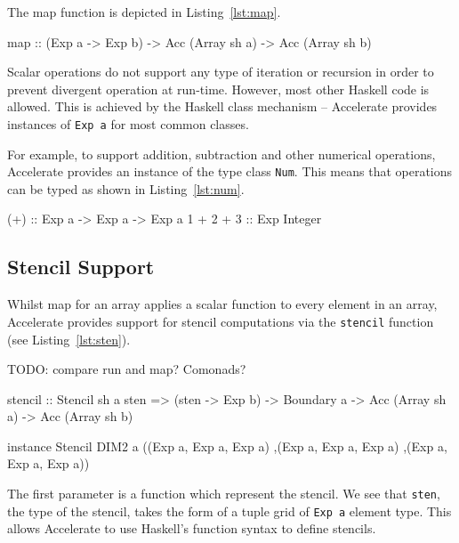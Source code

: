 \documentclass[12pt,a4paper,twoside]{scrbook}
\begin{document}
The map function is depicted in Listing~\ref{lst:map}.

\begin{hflisting}[label={lst:map}, caption=The type of the \texttt{map}
  operation as defined by Accelerate.]
map :: (Exp a -> Exp b) -> Acc (Array sh a)
       -> Acc (Array sh b)
\end{hflisting}

Scalar operations do not support any type of iteration or recursion in order to
prevent divergent operation at run-time. However, most other Haskell code is
allowed. This is achieved by the Haskell class mechanism -- Accelerate provides
instances of \texttt{Exp a} for most common classes.

For example, to support addition, subtraction and other numerical operations,
Accelerate provides an instance of the type class \texttt{Num}. This means that
operations can be typed as shown in Listing~\ref{lst:num}.

\begin{hflisting}[label={lst:num}, caption=The type of addition overloaded by Accelerate.]
(+) :: Exp a -> Exp a -> Exp a
1 + 2 + 3 :: Exp Integer
\end{hflisting}

\subsection{Stencil Support}

Whilst map for an array applies a scalar function to every element in an array,
Accelerate provides support for stencil computations via the \texttt{stencil}
function (see Listing~\ref{lst:sten}).

TODO: compare run and map? Comonads?

\begin{hflisting}[label={lst:sten}, caption={The type of the stencil application
  function in Accelerate. I have also included an example instance of the
  \texttt{Stencil} type class. Many others are also possible.}]
stencil :: Stencil sh a sten =>
           (sten -> Exp b) ->
           Boundary a ->
           Acc (Array sh a) ->
           Acc (Array sh b)

instance Stencil DIM2 a ((Exp a, Exp a, Exp a)
                        ,(Exp a, Exp a, Exp a)
                        ,(Exp a, Exp a, Exp a))
\end{hflisting}

The first parameter is a function which represent the stencil. We see that
\texttt{sten}, the type of the stencil, takes the form of a tuple grid of
\texttt{Exp a} element type. This allows Accelerate to use Haskell's function
syntax to define stencils.
\end{document}
